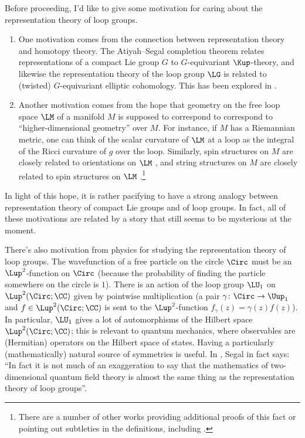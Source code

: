 Before proceeding, I'd like to give some motivation for caring about the
representation theory of loop groups.
\begin{enumerate}[(1)]
	\item One motivation comes from the connection between representation theory and homotopy theory. The
	Atiyah--Segal completion theorem \cites[Theorem 7.2]{Ati61}[\S 4.8]{AH61}[Theorem
	2.1]{AS69} relates representations of a compact Lie group
	$G$ to $G$-equivariant $\Kup$-theory, and likewise the representation theory of the loop group $\LG$ is related
	to (twisted) $G$-equivariant elliptic cohomology. This has been explored in \cite{Bry90, Dev96, Liu96, And00,
	And03, Gro07, Lur09a, Gan14, Lau16, Kit19, Rez20, BET21}.
	\item Another motivation comes from the hope that geometry on the free loop space $\LM$ of a manifold $M$ is
	supposed to correspond to correspond to ``higher-dimensional geometry'' over $M$. For instance, if $M$ has a Riemannian metric, one can
	think of the scalar curvature of $\LM$ at a loop as the integral of the Ricci curvature of $g$ over the loop.
	Similarly, spin structures on $M$ are closely related to orientations on $\LM$ \cites{Wit85}[\S
	3]{Ati85}{Wit88}[\S 2]{McL92}[Theorem 9]{ST05}[Corollary E, \S 1.2]{Wal16}, and string structures on $M$ are
	closely related to spin structures on $\LM$ \cites{Kil87}[Theorem 6.9]{NW13}.\footnote{There are a number of
	other works providing additional proofs of this fact or pointing out subtleties in the definitions,
	including \cites{PW88}{CP89}[\S 3]{McL92}{KY98}{ST05}{KM13a}{Wal15}{Cap16}{Wal16a}{Kri20}.}
\end{enumerate}
In light of this hope, it is rather pacifying to
have a strong analogy between representation theory of compact Lie groups and of loop groups. In fact, all of
these motivations are related by a story that still seems to be mysterious at the moment.

There's also motivation from physics for studying the representation theory of
loop groups. The wavefunction of a free particle on the circle $\Circ$ must be an
$\Lup^2$-function on $\Circ$ (because the probability of finding the particle
somewhere on the circle is $1$). There is an action of the loop group $\LU_1$
on $\Lup^2(\Circ;\CC)$ given by pointwise multiplication (a pair $\gamma \colon \Circ\to
\Uup_1$ and $f\in \Lup^2(\Circ;\CC)$ is sent to the $\Lup^2$-function $f_\gamma(z) =
\gamma(z) f(z)$). In particular, $\LU_1$ gives a lot of automorphisms of the
Hilbert space $\Lup^2(\Circ;\CC)$; this is relevant to quantum mechanics, where
observables are (Hermitian) operators on the Hilbert space of states. Having a
particularly (mathematically) natural source of symmetries is useful. In
\cite{segal-survey}, Segal in fact says: ``In fact it is not much of an
exaggeration to say that the mathematics of two-dimensional quantum field theory
is almost the same thing as the representation theory of loop groups''.


